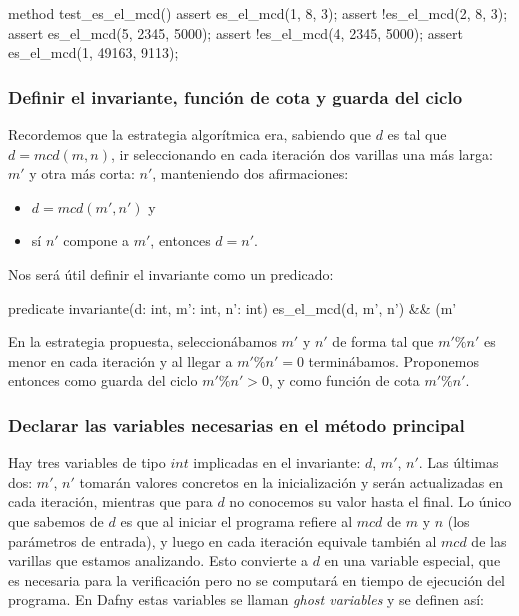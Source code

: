 \documentclass[12pt, a4paper, openany, fleqn]{book}
\begin{document}
    \begin{greenbox}
    \begin{dafny}[gobble=8]
        method test_es_el_mcd(){
            assert es_el_mcd(1, 8, 3);
            assert !es_el_mcd(2, 8, 3);
            assert es_el_mcd(5, 2345, 5000);
            assert !es_el_mcd(4, 2345, 5000);
            assert es_el_mcd(1, 49163, 9113);
        }
    \end{dafny}
    \end{greenbox}

    \subsubsection{Definir el invariante, función de cota y guarda del ciclo}

    Recordemos que la estrategia algorítmica era, sabiendo que $d$ es tal que $d = mcd(m, n)$, ir seleccionando en cada iteración dos varillas una más larga: $m'$ y otra más corta: $n'$, manteniendo dos afirmaciones:
    \begin{itemize}
        \item $d = mcd(m', n')$ y
        \item sí $n'$ compone a $m'$, entonces $d = n'$.
    \end{itemize}

    Nos será útil definir el invariante como un predicado:

    \begin{greenbox}
    \begin{dafny}[gobble=8]
        predicate invariante(d: int, m': int, n': int) {
            es_el_mcd(d, m', n')
            && (m' %
        }
    \end{dafny}
    \end{greenbox}

    En la estrategia propuesta, seleccionábamos $m'$ y $n'$ de forma tal que $m'\%n'$ es menor en cada iteración y al llegar a $m'\%n' = 0$ terminábamos. Proponemos entonces como guarda del ciclo $m'\%n'>0$, y como función de cota $m'\%n'$.

    \subsubsection{Declarar las variables necesarias en el método principal}
    Hay tres variables de tipo $int$ implicadas en el invariante: $d$, $m'$, $n'$.
    Las últimas dos: $m'$, $n'$ tomarán valores concretos en la inicialización y serán actualizadas en cada iteración, mientras que para $d$ no conocemos su valor hasta el final. Lo único que sabemos de $d$ es que al iniciar el programa refiere al $mcd$ de $m$ y $n$ (los parámetros de entrada), y luego en cada iteración equivale también al $mcd$ de las varillas que estamos analizando. Esto convierte a $d$ en una variable especial, que es necesaria para la verificación pero no se computará en tiempo de ejecución del programa. En Dafny estas variables se llaman \textit{ghost variables} y se definen así:
\end{document}
